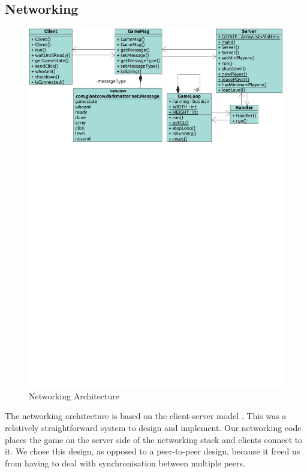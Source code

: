 \subsection{Networking}
\begin{figure}
  \includegraphics[width=\textwidth,trim=0 20cm 0 0]{img/network-uml.pdf}
  \caption{Networking Architecture}
  \label{fig:network_uml}
\end{figure}

The networking architecture is based on the client-server model
\cite{davison2008}. This was a relatively straightforward system to
design and implement. Our networking code places the game on the
server side of the networking stack and clients connect to it. We
chose this design, as opposed to a peer-to-peer design, because it
freed us from having to deal with synchronisation between multiple
peers.


